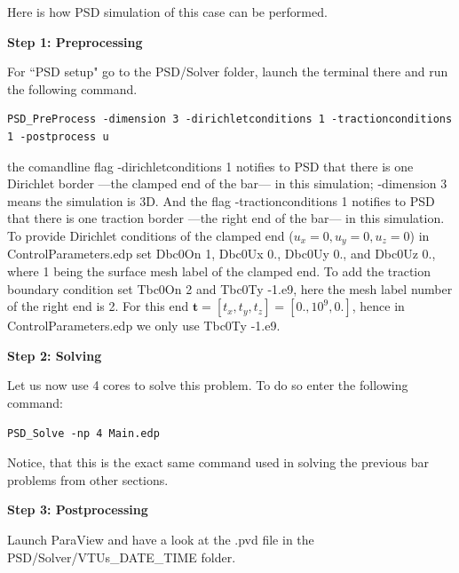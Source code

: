 Here is how PSD simulation of this case can be performed.

\textbf{Step 1: Preprocessing}

For ``PSD setup" go to the {\ttfamily PSD/Solver} folder, launch the terminal there and run the following command.
\begin{lstlisting}[style=Linux]
PSD_PreProcess -dimension 3 -dirichletconditions 1 -tractionconditions 1 -postprocess u
\end{lstlisting}
%
the comandline flag {\ttfamily -dirichletconditions 1} notifies to PSD that there is one Dirichlet border ---the clamped end of the bar--- in this simulation; {\ttfamily -dimension 3} means the simulation is 3D. And the flag {\ttfamily -tractionconditions 1} notifies to PSD that there is one traction border ---the right end of the bar--- in this simulation. 
To provide Dirichlet conditions of the  clamped end ($u_x=0,u_y=0,u_z=0$) in {\ttfamily ControlParameters.edp} set {\ttfamily Dbc0On 1}, {\ttfamily Dbc0Ux 0.}, {\ttfamily Dbc0Uy 0.}, and {\ttfamily Dbc0Uz 0.}, where 1 being the surface mesh label of the clamped end. To add the traction boundary condition set  {\ttfamily Tbc0On 2} and {\ttfamily Tbc0Ty -1.e9}, here the mesh label number of the right end is 2. For this end $\mathbf t=[t_x,t_y,t_z]=[0.,10^9,0.]$, hence in {\ttfamily ControlParameters.edp} we only  use {\ttfamily Tbc0Ty -1.e9}. 


\textbf{Step 2: Solving}

Let us now use 4 cores to solve this problem. To do so enter the following command:

\begin{lstlisting}[style=Linux]
PSD_Solve -np 4 Main.edp
\end{lstlisting}
%
Notice, that this is the exact same command used in solving the previous bar problems from other sections.


\textbf{Step 3: Postprocessing}

Launch ParaView and have a look at the  {\ttfamily .pvd} file in the  {\ttfamily PSD/Solver/VTUs\_DATE\_TIME} folder. 

